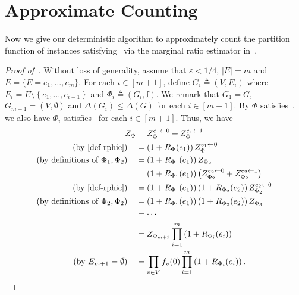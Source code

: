 \documentclass[11pt]{article}
\newcommand{\abs}[1]{\left\vert#1\right\vert}
\newcommand{\set}[1]{\left\{#1\right\}}
\newcommand{\vecf}{\boldsymbol{f}}
\begin{document}
\section{Approximate Counting}

Now we give our deterministic algorithm to approximately count the partition function of instances satisfying~ via the marginal ratio estimator in~.

\begin{proof}[Proof of~]
    Without loss of generality, assume that $\varepsilon < 1/4$, $\abs{E} = m$ and $E = \{E = e_1, \ldots, e_m\}$. For each $ i \in [m + 1]$, define $G_i \triangleq (V, E_i)$ where $E_i = E \setminus \set{e_1, \ldots, e_{i - 1}}$ 
    and $\Phi_i \triangleq (G_i, \vecf)$. We remark that $G_1 = G$, $G_{m + 1} = (V, \emptyset)$ and $\Delta(G_i)\leq \Delta(G)$ for each $i\in [m+1]$.     
    By $\Phi$ satisfies~, we also have 
    $\Phi_i$ satisfies~ for each $i \in [m+1]$. 
    Thus, we have 
    \begin{equation}
    \begin{aligned}\label{eq-z-decompose}
        Z_{\Phi} &= Z_{\Phi}^{e_1 \gets 0} + Z_{\Phi}^{e_1 \gets 1} \\
\left(\text{by \eqref{def-rphie}}\right) \quad       &= \left(1 + R_{\Phi}(e_1)\right) Z_{\Phi}^{e_1 \gets 0} \\
\left(\text{by definitions of $\Phi_1,\Phi_2$}\right) \quad        &= \left(1 + R_{\Phi_1}(e_1)\right) Z_{\Phi_2} \\
        &= \left(1 + R_{\Phi_1}(e_1)\right) \left(Z_{\Phi_2}^{e_2 \gets 0} + Z_{\Phi_2}^{e_2 \gets 1}\right) \\
\left(\text{by \eqref{def-rphie}}\right) \quad        &= \left(1 + R_{\Phi_1}(e_1)\right) \left(1 + R_{\Phi_2}(e_2)\right) Z_{\Phi_2}^{e_2 \gets 0} \\
\left(\text{by definitions of $\Phi_2,\Phi_2$}\right) \quad         &= \left(1 + R_{\Phi_1}(e_1)\right) \left(1 + R_{\Phi_2}(e_2)\right) Z_{\Phi_3} \\
        &= \cdots \\
        &= Z_{\Phi_{m + 1}}\prod_{i = 1}^{m} \left(1 + R_{\Phi_i}(e_i)\right) \\
\left(\text{by $E_{m + 1} = \emptyset$}\right) \quad        &= \prod_{v \in V} f_v(0) \prod_{i = 1}^{m} \left(1 + R_{\Phi_i}(e_i)\right).
    \end{aligned} 

\end{equation}
\end{proof}
\end{document}
